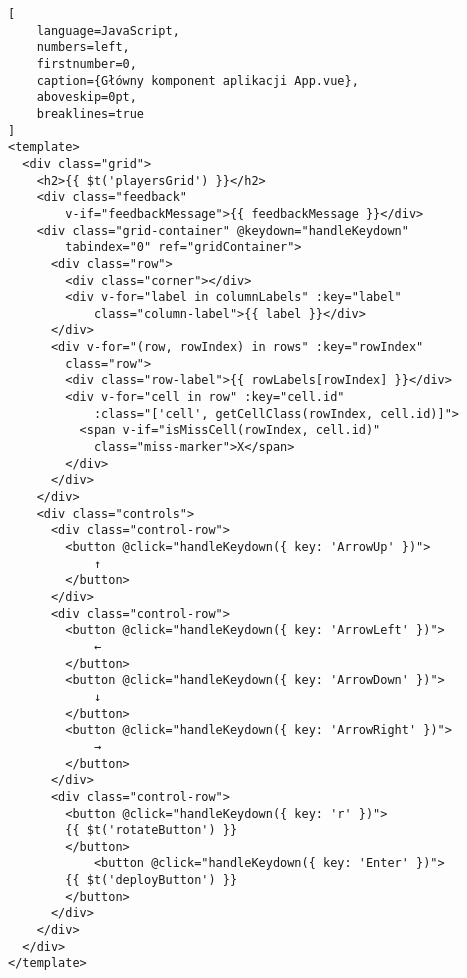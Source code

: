 \begin{addmargin}[0mm]{0mm}
\begin{lstlisting}[
    language=JavaScript,
    numbers=left,
    firstnumber=0,
    caption={Główny komponent aplikacji App.vue},
    aboveskip=0pt,
    breaklines=true
]
<template>
  <div class="grid">
    <h2>{{ $t('playersGrid') }}</h2>
    <div class="feedback" 
        v-if="feedbackMessage">{{ feedbackMessage }}</div>
    <div class="grid-container" @keydown="handleKeydown"
        tabindex="0" ref="gridContainer">
      <div class="row">
        <div class="corner"></div>
        <div v-for="label in columnLabels" :key="label"
            class="column-label">{{ label }}</div>
      </div>
      <div v-for="(row, rowIndex) in rows" :key="rowIndex" 
        class="row">
        <div class="row-label">{{ rowLabels[rowIndex] }}</div>
        <div v-for="cell in row" :key="cell.id" 
            :class="['cell', getCellClass(rowIndex, cell.id)]">
          <span v-if="isMissCell(rowIndex, cell.id)"
            class="miss-marker">X</span>
        </div>
      </div>
    </div>
    <div class="controls">
      <div class="control-row">
        <button @click="handleKeydown({ key: 'ArrowUp' })">
            ↑
        </button>
      </div>
      <div class="control-row">
        <button @click="handleKeydown({ key: 'ArrowLeft' })">
            ←
        </button>
        <button @click="handleKeydown({ key: 'ArrowDown' })">
            ↓
        </button>
        <button @click="handleKeydown({ key: 'ArrowRight' })">
            →
        </button>
      </div>
      <div class="control-row">
        <button @click="handleKeydown({ key: 'r' })">
        {{ $t('rotateButton') }}
        </button>
            <button @click="handleKeydown({ key: 'Enter' })">
        {{ $t('deployButton') }}
        </button>
      </div>
    </div>
  </div>
</template>



\end{lstlisting}
\end{addmargin}
